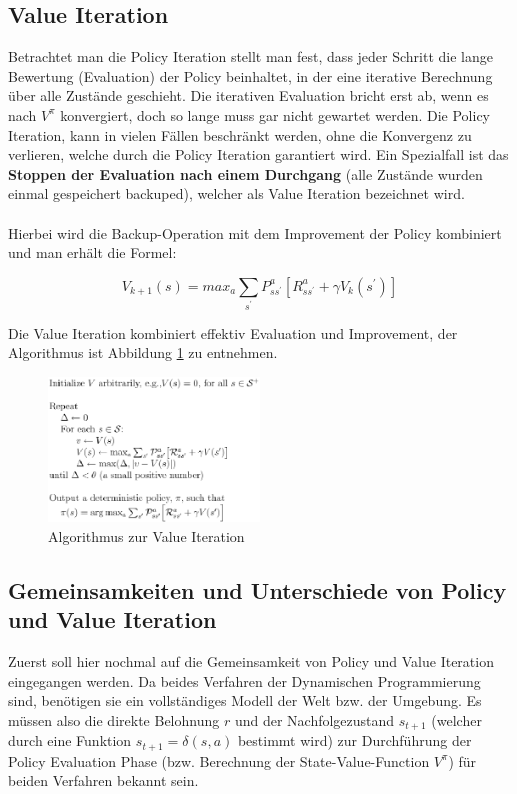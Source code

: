 \documentclass[10pt]{scrartcl}
\begin{document}
\subsection{Value Iteration}
Betrachtet man die Policy Iteration stellt man fest, dass jeder Schritt die lange Bewertung (Evaluation) der Policy beinhaltet, in der eine iterative Berechnung über alle Zustände geschieht. Die iterativen Evaluation bricht erst ab, wenn es nach $V^{\pi}$ konvergiert, doch so lange muss gar nicht gewartet werden. Die Policy Iteration, kann in vielen Fällen beschränkt werden, ohne die Konvergenz zu verlieren, welche durch die Policy Iteration garantiert wird. Ein Spezialfall ist das \textbf{Stoppen der Evaluation nach einem Durchgang} (alle Zustände wurden einmal gespeichert \glqq backuped\grqq\xspace), welcher als Value Iteration bezeichnet wird.\\
\\
Hierbei wird die Backup-Operation mit dem Improvement der Policy kombiniert und man erhält die Formel:

\begin{equation}
V_{k+1}(s) = max_{a} \sum_{s^{'}} P^a_{ss^{'}} [R^a_{ss^{'}} + \gamma V_{k} (s^{'})]
\end{equation}

Die Value Iteration kombiniert effektiv Evaluation und Improvement, der Algorithmus ist Abbildung \ref{fig:Value} zu entnehmen.

\begin{figure}[htbp]
	\centering	\includegraphics[width=0.5\textwidth]{Bilder/Value.png}
	\caption{Algorithmus zur Value Iteration}
	\label{fig:Value}
\end{figure}

\subsection{Gemeinsamkeiten und Unterschiede von Policy und Value Iteration}
Zuerst soll hier nochmal auf die Gemeinsamkeit von Policy und Value Iteration eingegangen werden. 
Da beides Verfahren der Dynamischen Programmierung sind, benötigen sie ein vollständiges Modell der Welt bzw. der Umgebung.
Es müssen also die direkte Belohnung $r$ und der Nachfolgezustand $s_{t+1}$ (welcher durch eine Funktion $s_{t+1} = \delta(s,a)$ bestimmt wird) zur Durchführung der Policy Evaluation Phase (bzw. Berechnung der State-Value-Function $V^{\pi}$) für beiden Verfahren bekannt sein.
\end{document}
